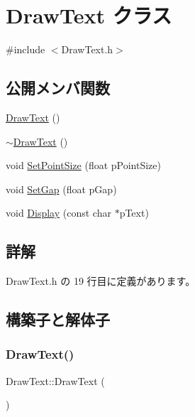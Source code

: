\hypertarget{class_draw_text}{}\section{Draw\+Text クラス}
\label{class_draw_text}


{\ttfamily \#include $<$Draw\+Text.\+h$>$}

\subsection*{公開メンバ関数}
\begin{DoxyCompactItemize}
\item 
\hyperlink{class_draw_text_ad078277ed1d6d3a63d38184f8d8ccd36}{Draw\+Text} ()
\item 
\hyperlink{class_draw_text_abfa7867c99c8e6acd7b964a63a90d376}{$\sim$\+Draw\+Text} ()
\item 
void \hyperlink{class_draw_text_a7914906420b5794102a873da4188ba24}{Set\+Point\+Size} (float p\+Point\+Size)
\item 
void \hyperlink{class_draw_text_a72f1583711a972be40df3b75912e98fa}{Set\+Gap} (float p\+Gap)
\item 
void \hyperlink{class_draw_text_ac078a452b01ea8011cf7a9fbc97f047a}{Display} (const char $\ast$p\+Text)
\end{DoxyCompactItemize}


\subsection{詳解}


 Draw\+Text.\+h の 19 行目に定義があります。



\subsection{構築子と解体子}
\mbox{\label{class_draw_text_ad078277ed1d6d3a63d38184f8d8ccd36}} 
\subsubsection{\texorpdfstring{Draw\+Text()}{DrawText()}}
{\footnotesize\ttfamily Draw\+Text\+::\+Draw\+Text (\begin{DoxyParamCaption}{ }\end{DoxyParamCaption})}




